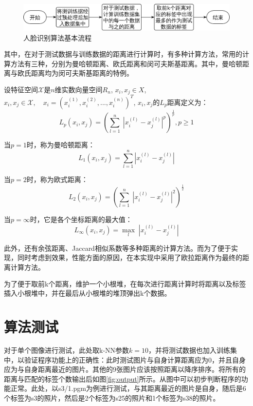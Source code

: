 \documentclass{article}
\begin{document}
\begin{figure}[htpb]
    \centering
    \includegraphics[width=0.8\linewidth]{flow.png}
    \caption{人脸识别算法基本流程}
    \label{fig:flow}
\end{figure}

\par 其中，在对于测试数据与训练数据的距离进行计算时，有多种计算方法，常用的计算方法有三种，分别为曼哈顿距离、欧氏距离和闵可夫斯基距离。其中，曼哈顿距离与欧氏距离均为闵可夫斯基距离的特例。
\par 设特征空间\(\mathcal{X}\)是\(n\)维实数向量空间\(R_n\), \(x_i,x_j\in X\), \(x_i,x_j \in \mathcal{X}, \quad x_i=(x_i^{(1)},x_i^{(2)},...,x_i^{(n)})^T\), \(x_i,x_j\)的\(L_p\)距离定义为：
\[L_p(x_i,x_j) = (\sum_{l=1}^{n} \; |x_i^{(l)}-x_j^{(l)}|^p)^{\frac{1}{p}}, p\ge 1\]

\par 当\(p=1\)时，称为曼哈顿距离：
\[L_1(x_i,x_j)= \sum_{l=1}^{n} |x_i^{(l)}-x_j^{(l)}|\]

\par 当\(p=2\)时，称为欧式距离：
\[L_2(x_i,x_j) = (\sum_{l=1}^{n} \; |x_i^{(l)}-x_j^{(l)}|^{2})^{\frac{1}{2}}\]

\par 当\(p=\infty\)时，它是各个坐标距离的最大值：
\[L_{\infty}(x_i,x_j)= \mathop{max}_l \; |x_i^{(l)}-x_j^{(l)}|\]

\par 此外，还有余弦距离、Jaccard相似系数等多种距离的计算方法。而为了便于实现，同时考虑到效果，性能方面的原因，在本实现中采用了欧拉距离作为最终的距离计算方法。
\par 为了便于取前k个距离，维护一个小根堆，在每次进行距离计算时将距离以及标签插入小根堆中，并在最后从小根堆的堆顶弹出k个数据。

\section{算法测试}
\label{sec:suan_fa_ce_shi_}
\par 对于单个图像进行测试，此处取k-NN参数\(k=10\)，并将测试数据也加入训练集中，以验证程序功能上的正确性：此时测试图片与自身计算距离应为0，并且自身应为与自身距离最近的图片。其他的9张图片应该按照距离以降序排序。将所有的距离与匹配的标签个数输出后如图\ref{fig:output}所示。从图中可以初步判断程序的功能正常。此处，以s3/1.pgm为例进行测试，与其距离最近的图片是自身，随后是6个标签为s3的照片，然后是2个标签为s25的照片和1个标签为s38的照片。
\end{document}
